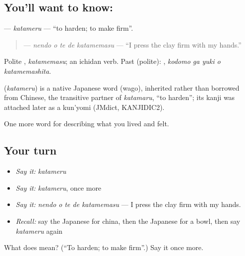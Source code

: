 \subsection*{You'll want to know: }
\textbf{} — \emph{katameru} — \textquotedblleft{}to harden; to make firm\textquotedblright{}.

\begin{quote}
\textbf{  } — \emph{nendo o te de katamemasu} — \textquotedblleft{}I press the clay firm with my hands.\textquotedblright{}
\end{quote}

Polite \textbf{}, \emph{katamemasu}; an ichidan verb. Past (polite): \textbf{  }, \emph{kodomo ga yuki o katamemashita}.

\begin{cousinweb}
\textbf{} (\emph{katameru}) is a native Japanese word (wago), inherited rather than borrowed from Chinese, the transitive partner of \emph{katamaru}, \textquotedblleft{}to harden\textquotedblright{}; its kanji was attached later as a kun'yomi (JMdict, KANJIDIC2).
\end{cousinweb}

\begin{grammarlens}[title={What you've built}]
One more word for describing what you lived and felt.
\end{grammarlens}

\subsection*{Your turn}
\begin{itemize}
\raggedright
  \item \emph{Say it:} \emph{katameru}
  \item \emph{Say it:} \emph{katameru}, once more
  \item \emph{Say it:} \emph{nendo o te de katamemasu} — I press the clay firm with my hands.
  \item \emph{Recall:} say the Japanese for china, then the Japanese for a bowl, then say \emph{katameru} again
\end{itemize}

\begin{tcolorbox}[breakable,colback=teal!4,colframe=teal!35!black,title={Before you move on}]
What does  mean? (\textquotedblleft{}To harden; to make firm\textquotedblright{}.) Say it once more.
\end{tcolorbox}
